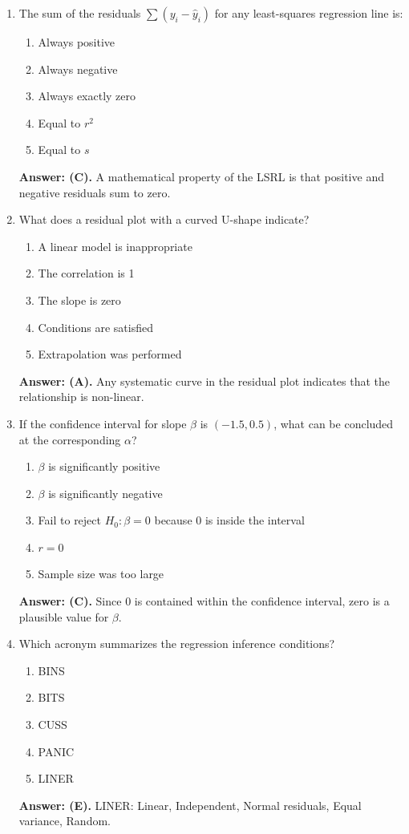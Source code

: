 \begin{enumerate}[leftmargin=1.5em]
  \item The sum of the residuals $\sum (y_i - \hat{y}_i)$ for any least-squares regression line is:
  \begin{enumerate}[label=(\Alph*)]
    \item Always positive \item Always negative \item Always exactly zero \item Equal to $r^2$ \item Equal to $s$
  \end{enumerate}
  \textbf{Answer: (C).} A mathematical property of the LSRL is that positive and negative residuals sum to zero.

  \item What does a residual plot with a curved U-shape indicate?
  \begin{enumerate}[label=(\Alph*)]
    \item A linear model is inappropriate \item The correlation is 1 \item The slope is zero \item Conditions are satisfied \item Extrapolation was performed
  \end{enumerate}
  \textbf{Answer: (A).} Any systematic curve in the residual plot indicates that the relationship is non-linear.

  \item If the confidence interval for slope $\beta$ is $(-1.5, 0.5)$, what can be concluded at the corresponding $\alpha$?
  \begin{enumerate}[label=(\Alph*)]
    \item $\beta$ is significantly positive \item $\beta$ is significantly negative \item Fail to reject $H_0: \beta = 0$ because 0 is inside the interval \item $r = 0$ \item Sample size was too large
  \end{enumerate}
  \textbf{Answer: (C).} Since 0 is contained within the confidence interval, zero is a plausible value for $\beta$.

  \item Which acronym summarizes the regression inference conditions?
  \begin{enumerate}[label=(\Alph*)]
    \item BINS \item BITS \item CUSS \item PANIC \item LINER
  \end{enumerate}
  \textbf{Answer: (E).} LINER: Linear, Independent, Normal residuals, Equal variance, Random.
\end{enumerate}

